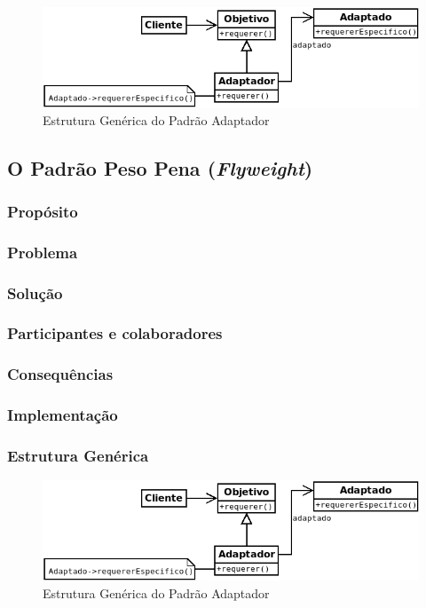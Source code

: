 \begin{figure}[h]
\begin{center}
\includegraphics[scale=0.6]{adaptador.png}
\caption{Estrutura Genérica do Padrão Adaptador}\label{fig:adaptador}
\end{center}
\end{figure}

\subsection{O Padrão Peso Pena (\textit{Flyweight})}
\subsubsection{Propósito}
\subsubsection{Problema}
\subsubsection{Solução}
\subsubsection{Participantes e colaboradores}
\subsubsection{Consequências}
\subsubsection{Implementação}
\subsubsection{Estrutura Genérica}

\begin{figure}[h]
\begin{center}
\includegraphics[scale=0.6]{adaptador.png}
\caption{Estrutura Genérica do Padrão Adaptador}\label{fig:adaptador}
\end{center}
\end{figure}

